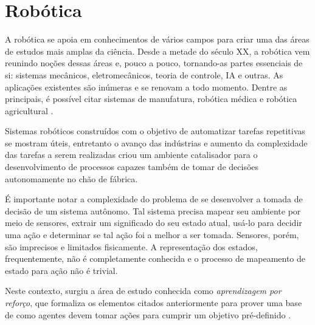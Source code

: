 \section{Robótica}
\par A robótica se apoia em conhecimentos de vários campos para criar uma das áreas de estudos mais amplas da ciência. Desde a metade do século XX, a robótica vem reunindo noções dessas áreas e, pouco a pouco, tornando-as partes essenciais de si: sistemas mecânicos, eletromecânicos, teoria de controle, IA e outras. As aplicações existentes são inúmeras e se renovam a todo momento. Dentre as principais, é possível citar sistemas de manufatura, robótica médica e robótica agricultural \cite{handbook2007}. 
\par Sistemas robóticos construídos com o objetivo de automatizar tarefas repetitivas se mostram úteis, entretanto o avanço das indústrias e aumento da complexidade das tarefas a serem realizadas criou um ambiente catalisador para o desenvolvimento de processos capazes também de tomar de decisões autonomamente no chão de fábrica.
\par É importante notar a complexidade do problema de se desenvolver a tomada de decisão de um sistema autônomo. Tal sistema precisa mapear seu ambiente por meio de sensores, extrair um significado do seu estado atual, usá-lo para decidir uma ação e determinar se tal ação foi a melhor a ser tomada. Sensores, porém, são imprecisos e limitados fisicamente. A representação dos estados, frequentemente, não é completamente conhecida e o processo de mapeamento de estado para ação não é trivial.
\par Neste contexto, surgiu a área de estudo conhecida como \textit{aprendizagem por reforço}, que formaliza os elementos citados anteriormente para prover uma base de como agentes devem tomar ações para cumprir um objetivo pré-definido \cite{sutton2018reinforcement}.


